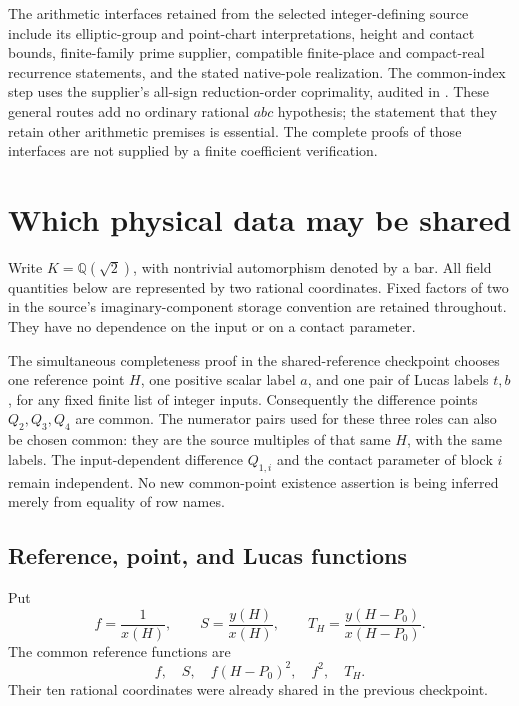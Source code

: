 \documentclass[11pt]{article}
\begin{document}
The arithmetic interfaces retained from the selected integer-defining
source include its elliptic-group and point-chart interpretations,
height and contact bounds, finite-family prime supplier, compatible
finite-place and compact-real recurrence statements, and the stated
native-pole realization. The common-index step uses the supplier's
all-sign reduction-order coprimality, audited in \cite{crt}.
These general routes add no ordinary rational \(abc\) hypothesis;
the statement that they retain other arithmetic premises is essential.
The complete proofs of those interfaces are not supplied by a finite
coefficient verification.

\section{Which physical data may be shared}

Write \(K=\mathbb Q(\sqrt2)\), with nontrivial automorphism denoted by a
bar.  All field quantities below are represented by two rational
coordinates.  Fixed factors of two in the source's imaginary-component
storage convention are retained throughout.  They have no dependence on
the input or on a contact parameter.

The simultaneous completeness proof in the shared-reference checkpoint
chooses one reference point \(H\), one positive scalar label \(a\), and
one pair of Lucas labels \(t,b\), for any fixed finite list of integer
inputs.  Consequently the difference points \(Q_2,Q_3,Q_4\) are common.
The numerator pairs used for these three roles can also be chosen common:
they are the source multiples of that same \(H\), with the same labels.
The input-dependent difference \(Q_{1,i}\) and the contact parameter of
block \(i\) remain independent.  No new common-point existence assertion
is being inferred merely from equality of row names.

\subsection{Reference, point, and Lucas functions}
Put
\[
 f=\frac1{x(H)},\qquad S=\frac{y(H)}{x(H)},\qquad
 T_H=\frac{y(H-P_0)}{x(H-P_0)}.
\]
The common reference functions are
\[
      f,\quad S,\quad f(H-P_0)^2,\quad f^2,\quad T_H.
\]
Their ten rational coordinates were already shared in the previous
checkpoint.
\end{document}
